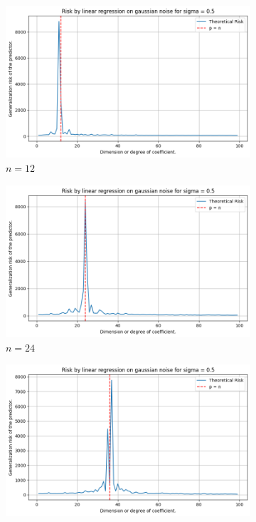 \documentclass{article}
\begin{document}
\begin{figure}[htb]
  \centering
  \newcommand{\imgwidth}{0.22\textwidth}

  \begin{subfigure}[b]{\imgwidth}
    \includegraphics[width=\linewidth]{img/descent_devel1.png}
    \caption{$n=12$}\label{fig:1a2}
  \end{subfigure}%
  \hfill
  \begin{subfigure}[b]{\imgwidth}
    \includegraphics[width=\linewidth]{img/descent_devel2.png}
    \caption{$n=24$}\label{fig:1b2}
  \end{subfigure}%
  \hfill
  \begin{subfigure}[b]{\imgwidth}
    \includegraphics[width=\linewidth]{img/descent_devel3.png}

\end{subfigure}
\end{figure}
\end{document}
